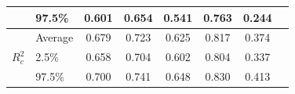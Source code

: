 \begin{table}[H]
\begin{tabular}{@{}llcccccc@{}}
                                           & 97.5\%  & 0.601 & 0.654 & 0.541 & 0.763 & 0.244 \\ \midrule
      \multirow{3}{*}{$R^2_c$}            & Average & 0.679 & 0.723 & 0.625 & 0.817 & 0.374 \\
                                           & 2.5\%   & 0.658 & 0.704 & 0.602 & 0.804 & 0.337 \\
                                           & 97.5\%  & 0.700 & 0.741 & 0.648 & 0.830 & 0.413 \\ \bottomrule
    \end{tabular}

\end{table}
